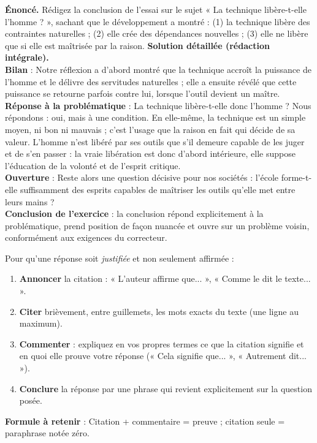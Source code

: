 \documentclass[11pt]{article}
\begin{document}
\begin{exoresolu}
\textbf{Énoncé.} Rédigez la conclusion de l'essai sur le sujet « La technique libère-t-elle l'homme ? », sachant que le développement a montré : (1) la technique libère des contraintes naturelles ; (2) elle crée des dépendances nouvelles ; (3) elle ne libère que si elle est maîtrisée par la raison.
\tcblower
\textbf{Solution détaillée (rédaction intégrale).}\\
\textbf{Bilan} : Notre réflexion a d'abord montré que la technique accroît la puissance de l'homme et le délivre des servitudes naturelles ; elle a ensuite révélé que cette puissance se retourne parfois contre lui, lorsque l'outil devient un maître.\\
\textbf{Réponse à la problématique} : La technique libère-t-elle donc l'homme ? Nous répondons : oui, mais à une condition. En elle-même, la technique est un simple moyen, ni bon ni mauvais ; c'est l'usage que la raison en fait qui décide de sa valeur. L'homme n'est libéré par ses outils que s'il demeure capable de les juger et de s'en passer : la vraie libération est donc d'abord intérieure, elle suppose l'éducation de la volonté et de l'esprit critique.\\
\textbf{Ouverture} : Reste alors une question décisive pour nos sociétés : l'école forme-t-elle suffisamment des esprits capables de maîtriser les outils qu'elle met entre leurs mains ?\\
\textbf{Conclusion de l'exercice} : la conclusion répond explicitement à la problématique, prend position de façon nuancée et ouvre sur un problème voisin, conformément aux exigences du correcteur.
\end{exoresolu}

\begin{methode}
Pour qu'une réponse soit \emph{justifiée} et non seulement affirmée :
\begin{enumerate}
\item \textbf{Annoncer} la citation : « L'auteur affirme que... », « Comme le dit le texte... ».
\item \textbf{Citer} brièvement, entre guillemets, les mots exacts du texte (une ligne au maximum).
\item \textbf{Commenter} : expliquez en vos propres termes ce que la citation signifie et en quoi elle prouve votre réponse (« Cela signifie que... », « Autrement dit... »).
\item \textbf{Conclure} la réponse par une phrase qui revient explicitement sur la question posée.
\end{enumerate}
\textbf{Formule à retenir} : Citation + commentaire = preuve ; citation seule = paraphrase notée zéro.
\end{methode}
\end{document}
